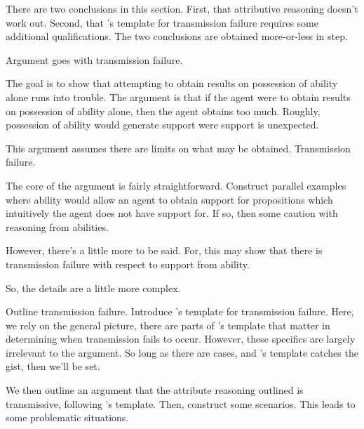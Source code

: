 \documentclass[10pt]{article}
\begin{document}
\begin{note}
  There are two conclusions in this section.
  First, that attributive reasoning doesn't work out.
  Second, that \citeauthor{Wright:2016wl}'s template for transmission failure requires some additional qualifications.
  The two conclusions are obtained more-or-less in step.

  Argument goes with transmission failure.

  The goal is to show that attempting to obtain results on possession of ability alone runs into trouble.
  The argument is that if the agent were to obtain results on possession of ability alone, then the agent obtains too much.
  Roughly, possession of ability would generate support were support is unexpected.

  This argument assumes there are limits on what may be obtained.
  Transmission failure.

  The core of the argument is fairly straightforward.
  Construct parallel examples where ability would allow an agent to obtain support for propositions which intuitively the agent does not have support for.
  If so, then some caution with reasoning from abilities.

  However, there's a little more to be said.
  For, this may show that there is transmission failure with respect to support from ability.

  So, the details are a little more complex.

  Outline transmission failure.
  Introduce \citeauthor{Wright:2016wl}'s template for transmission failure.
  Here, we rely on the general picture, there are parts of \citeauthor{Wright:2016wl}'s template that matter in determining when transmission fails to occur.
  However, these specifics are largely irrelevant to the argument.
  So long as there are cases, and \citeauthor{Wright:2016wl}'s template catches the gist, then we'll be set.

  We then outline an argument that the attribute reasoning outlined is transmissive, following \citeauthor{Wright:2016wl}'s template.
  Then, construct some scenarios.
  This leads to some problematic situations.
\end{note}



\newpage
\end{document}
